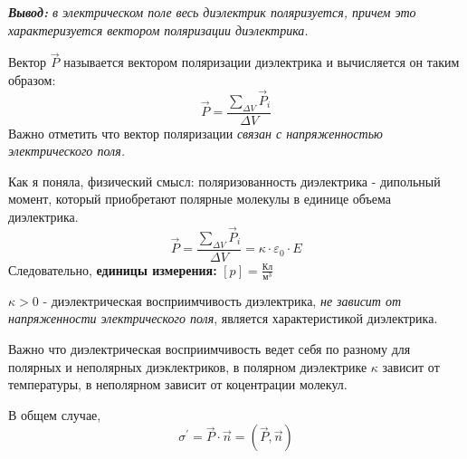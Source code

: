 \documentclass[../main.tex]{subfiles}
\begin{document}
\vspace{5px}

\textit{\textbf{Вывод:} в электрическом поле весь диэлектрик поляризуется, причем это характеризуется вектором поляризации диэлектрика.}

\vspace{5px}

 Вектор $\vec P$ называется вектором поляризации диэлектрика и вычисляется он таким образом:
\[ \vec P = \frac{\sum_{\Delta V} \vec P_i}{\Delta V}\]
Важно отметить что вектор поляризации \textit{связан с напряженностью электрического поля.}

Как я поняла, физический смысл: поляризованность диэлектрика - дипольный момент, который приобретают полярные молекулы в единице объема диэлектрика.
\[ \vec P  = \frac{\sum_{\Delta V} \vec P_i}{\Delta V} = \kappa \cdot \varepsilon_0 \cdot E\]
Следовательно, \textbf{единицы измерения:} $[p] = \frac{\text{Кл}}{\text{м}^3}$

\vspace{5px}

$\kappa > 0$ - диэлектрическая восприимчивость диэлектрика, \textit{не зависит от напряженности электрического поля}, является характеристикой диэлектрика.

\vspace{5px}

Важно что диэлектрическая восприимчивость ведет себя по разному для полярных и неполярных диэклектриков, в полярном диэлектрике $\kappa$ зависит от температуры, в неполярном зависит от коцентрации молекул.

В общем случае, \[ \sigma^\prime = \vec P \cdot \vec n = (\vec P, \vec n) \]
\end{document}
